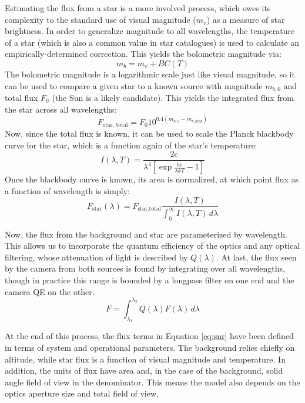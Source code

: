 \documentclass[twocolumn,letterpaper]{IEEEAerospace2012}
\newcommand{\parens} [1] {\left(  #1  \right)}
\newcommand{\brackets} [1] {\left[ #1 \right]}
\newcommand{\BC}{\mathit{BC}}
\newcommand{\sub}[1]{\text{#1}} %
\begin{document}
Estimating the flux from a star is a more involved process, which owes its complexity to the standard use of visual magnitude ($m_v$) as a measure of star brightness. In order to generalize magnitude to all wavelengths, the temperature of a star (which is also a common value in star catalogues) is used to calculate an empirically-determined correction. %
This yields the bolometric magnitude via:
\begin{equation}
    \label{eq:bolometric}
    m_b = m_v + \BC (T)
\end{equation}
The bolometric magnitude is a logarithmic scale just like visual magnitude, so it can be used to compare a given star to a known source with magnitude $m_{b,0}$ and total flux $F_0$ (the Sun is a likely candidate). This yields the integrated flux from the star across all wavelengths:
\begin{equation}
    \label{eq:totalflux}
    F_{\sub{star, total}} = F_0 10^{0.4 \parens{m_{b,0} - m_{b,\sub{star}}}}
\end{equation}
Now, since the total flux is known, it can be used to scale the Planck blackbody curve for the star, which is a function again of the star's temperature:
\begin{equation}
    \label{eq:planck}
    I(\lambda, T) = \frac{2c}{\lambda^4 \brackets{\exp{\frac{hc}{\lambda k T}} - 1}}
\end{equation}
Once the blackbody curve is known, its area is normalized, at which point flux as a function of wavelength is simply:
\begin{equation}
    \label{eq:flux}
    F_{\sub{star}}(\lambda) = F_{\sub{star,total}}\frac{I(\lambda,T)}{\int_0^\infty I(\lambda,T) \, d\lambda}
\end{equation}

Now, the flux from the background and star are parameterized by wavelength. This allows us to incorporate the quantum efficiency of the optics and any optical filtering, whose attenuation of light is described by $Q(\lambda)$. At last, the flux seen by the camera from both sources is found by integrating over all wavelengths, though in practice this range is bounded by a longpass filter on one end and the camera QE on the other.
\begin{equation}
    \label{eq:totalfluxes}
    F = \int_{\lambda_1}^{\lambda_2} Q(\lambda) F(\lambda) \, d\lambda
\end{equation}

At the end of this process, the flux terms in Equation \ref{eq:snr} have been defined in terms of system and operational parameters. The background relies chiefly on altitude, while star flux is a function of visual magnitude and temperature. In addition, the units of flux have area and, in the case of the background, solid angle field of view in the denominator. This means the model also depends on the optics aperture size and total field of view.
\end{document}
